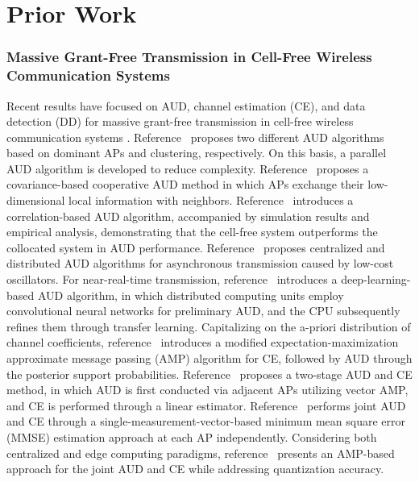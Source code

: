 \section{Prior Work}
\subsubsection{Massive Grant-Free Transmission in Cell-Free Wireless Communication Systems}
Recent results have focused on AUD, channel estimation (CE), and data detection (DD) for massive grant-free transmission in cell-free wireless communication systems \cite{sun2023joint_arxiv,sun2023deep_unfolding, Ganesan2021algorithm, shao2020covariance, wang2021grant, Li2023Asynchronous, Diao2023Scalable, Jiang2023EM,wang2022two,guo2022joint, Ke2021massive, Johnston2022model, Di2022adaptive, Femenias2023repetition, zhou2023active, Iimori2021grant}.
%
Reference~\cite{Ganesan2021algorithm} proposes two different AUD algorithms based on dominant APs and clustering, respectively. On this basis, a parallel AUD algorithm is developed to reduce complexity.
%
Reference~\cite{shao2020covariance} proposes a covariance-based cooperative AUD method in which APs exchange their low-dimensional local information with neighbors.
%
Reference~\cite{wang2021grant} introduces a correlation-based AUD algorithm, accompanied by simulation results and empirical analysis, demonstrating that the cell-free system outperforms the collocated system in AUD performance.
%
Reference~\cite{Li2023Asynchronous} proposes centralized and distributed AUD algorithms for asynchronous transmission caused by low-cost oscillators.
%
For near-real-time transmission, reference~\cite{Diao2023Scalable} introduces a deep-learning-based AUD algorithm, in which distributed computing units employ convolutional neural networks for preliminary AUD, and the CPU subsequently refines them through transfer learning.
%
Capitalizing on the a-priori distribution of channel coefficients, reference~\cite{Jiang2023EM} introduces a modified expectation-maximization approximate message passing (AMP) algorithm for CE, followed by AUD through the posterior support probabilities.
%
Reference~\cite{wang2022two} proposes a two-stage AUD and CE method, in which AUD is first conducted via adjacent APs utilizing vector AMP, and CE is performed through a linear estimator.
%
Reference~\cite{guo2022joint} performs joint AUD and CE through a single-measurement-vector-based minimum mean square error (MMSE) estimation approach at each AP independently.
%
Considering both centralized and edge computing paradigms, reference~\cite{Ke2021massive} presents an AMP-based approach for the joint AUD and CE while addressing quantization accuracy.
